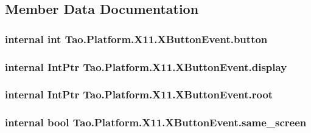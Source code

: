 \subsection{Member Data Documentation}
\hypertarget{struct_tao_1_1_platform_1_1_x11_1_1_x_button_event_aa7d9e9ec12a0c79939d54468005c0974}{
\subsubsection[{button}]{\setlength{\rightskip}{0pt plus 5cm}internal int {\bf Tao.Platform.X11.XButtonEvent.button}}}
\label{struct_tao_1_1_platform_1_1_x11_1_1_x_button_event_aa7d9e9ec12a0c79939d54468005c0974}
\hypertarget{struct_tao_1_1_platform_1_1_x11_1_1_x_button_event_a035f4ff904fa441b04ccecd4c188964d}{
\subsubsection[{display}]{\setlength{\rightskip}{0pt plus 5cm}internal IntPtr {\bf Tao.Platform.X11.XButtonEvent.display}}}
\label{struct_tao_1_1_platform_1_1_x11_1_1_x_button_event_a035f4ff904fa441b04ccecd4c188964d}
\hypertarget{struct_tao_1_1_platform_1_1_x11_1_1_x_button_event_a4acb1058d08206d8cb2292032c21a02d}{
\subsubsection[{root}]{\setlength{\rightskip}{0pt plus 5cm}internal IntPtr {\bf Tao.Platform.X11.XButtonEvent.root}}}
\label{struct_tao_1_1_platform_1_1_x11_1_1_x_button_event_a4acb1058d08206d8cb2292032c21a02d}
\hypertarget{struct_tao_1_1_platform_1_1_x11_1_1_x_button_event_a958f20c2906955c46178184ea7f34584}{
\subsubsection[{same\_\-screen}]{\setlength{\rightskip}{0pt plus 5cm}internal bool {\bf Tao.Platform.X11.XButtonEvent.same\_\-screen}}}
